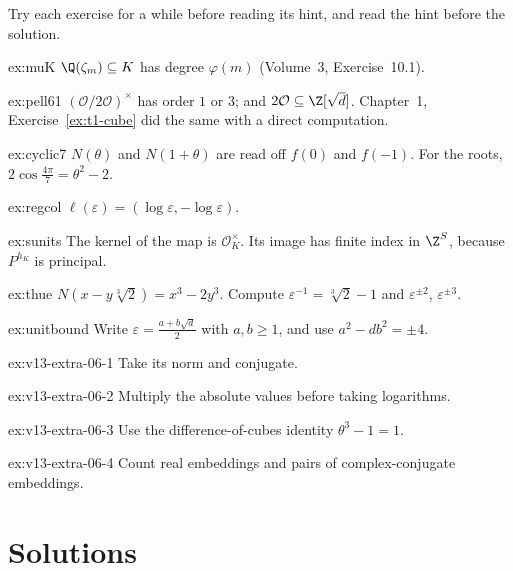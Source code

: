 Try each exercise for a while before reading its hint, and read the hint before the solution.

\begin{hint}{ex:muK}
$\Q(\zeta_m)\subseteq K$ has degree $\varphi(m)$ (Volume~3, Exercise~10.1).
\end{hint}
\begin{hint}{ex:pell61}
$(\mathcal O/2\mathcal O)^\times$ has order $1$ or $3$; and $2\mathcal O\subseteq\Z[\sqrt d]$. Chapter~1, Exercise~\ref{ex:t1-cube} did the same with a direct computation.
\end{hint}
\begin{hint}{ex:cyclic7}
$N(\theta)$ and $N(1+\theta)$ are read off $f(0)$ and $f(-1)$. For the roots, $2\cos\frac{4\pi}7=\theta^2-2$.
\end{hint}
\begin{hint}{ex:regcol}
$\ell(\varepsilon)=(\log\varepsilon,-\log\varepsilon)$.
\end{hint}
\begin{hint}{ex:sunits}
The kernel of the map is $\mathcal O_K^\times$. Its image has finite index in $\Z^S$, because $P^{h_K}$ is principal.
\end{hint}
\begin{hint}{ex:thue}
$N(x-y\sqrt[3]2)=x^3-2y^3$. Compute $\varepsilon^{-1}=\sqrt[3]2-1$ and $\varepsilon^{\pm2}$, $\varepsilon^{\pm3}$.
\end{hint}
\begin{hint}{ex:unitbound}
Write $\varepsilon=\frac{a+b\sqrt d}2$ with $a,b\ge1$, and use $a^2-db^2=\pm4$.
\end{hint}

\begin{hint}{ex:v13-extra-06-1}
Take its norm and conjugate.
\end{hint}

\begin{hint}{ex:v13-extra-06-2}
Multiply the absolute values before taking logarithms.
\end{hint}

\begin{hint}{ex:v13-extra-06-3}
Use the difference-of-cubes identity $\theta^3-1=1$.
\end{hint}

\begin{hint}{ex:v13-extra-06-4}
Count real embeddings and pairs of complex-conjugate embeddings.
\end{hint}

\section{Solutions}

